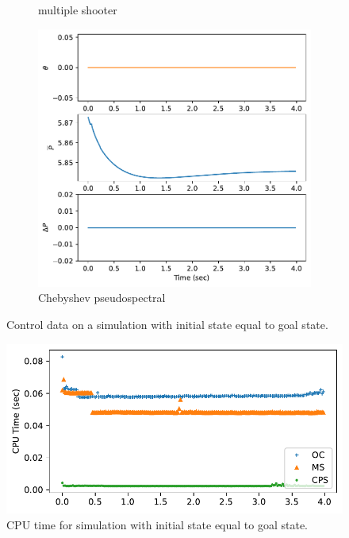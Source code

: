 \documentclass[]{article}
\begin{document}
\begin{figure}[H]
\begin{subfigure}[b]{0.3\textwidth}
		\caption{multiple shooter}
	\end{subfigure}
	\begin{subfigure}[b]{0.3\textwidth}
		\centering
		\includegraphics[width=\textwidth]{controlhover5.pdf}
		\caption{Chebyshev pseudospectral}
	\end{subfigure}
	\caption{Control data on a simulation with initial state equal to goal state.}
	\label{fig:control45z}
\end{figure}


\begin{figure}[H]
	\centering
	\includegraphics[width=\textwidth]{timehover.pdf}
	\caption{CPU time for simulation with initial state equal to goal state.}
	\label{fig:kfangle}
\end{figure}
\end{document}
